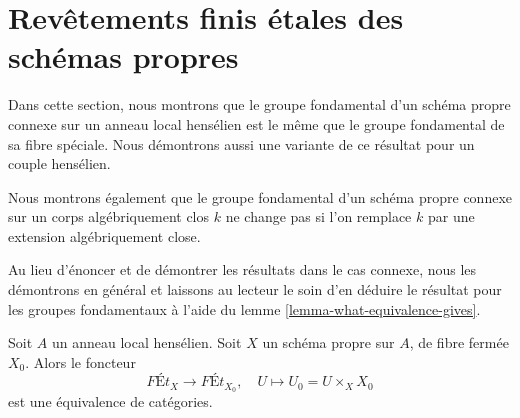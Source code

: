 \section{Revêtements finis étales des schémas propres}
\label{section-finite-etale-over-proper}

\noindent
Dans cette section, nous montrons que le groupe fondamental d'un schéma propre
connexe sur un anneau local hensélien est le même que le groupe fondamental
de sa fibre spéciale. Nous démontrons aussi une variante de ce résultat pour
un couple hensélien.

\medskip\noindent
Nous montrons également que le groupe
fondamental d'un schéma propre connexe sur un corps algébriquement clos $k$
ne change pas si l'on remplace $k$ par une extension algébriquement close.

\medskip\noindent
Au lieu d'énoncer et de démontrer les résultats dans le cas connexe,
nous les démontrons en général et laissons au lecteur le soin d'en déduire
le résultat pour les groupes fondamentaux à l'aide du
lemme \ref{lemma-what-equivalence-gives}.

\begin{lemma}
\label{lemma-finite-etale-on-proper-over-henselian}
Soit $A$ un anneau local hensélien. Soit $X$ un schéma propre sur $A$,
de fibre fermée $X_0$. Alors le foncteur
$$
\textit{F\'Et}_X \to \textit{F\'Et}_{X_0},\quad
U \longmapsto U_0 = U \times_X X_0
$$
est une équivalence de catégories.
\end{lemma}

